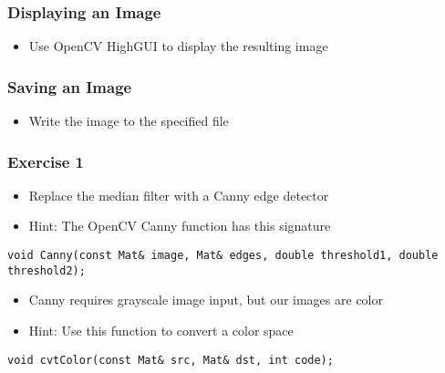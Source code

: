 \begin{frame}
\frametitle{Displaying an Image}
\begin{center}
\begin{itemize}
\item Use OpenCV HighGUI to display the resulting image
\end{itemize}

\end{center}
\end{frame}


\begin{frame}
\frametitle{Saving an Image}
\begin{center}
\begin{itemize}
\item Write the image to the specified file
\end{itemize}

\end{center}
\end{frame}


\begin{frame}[fragile]
\frametitle{Exercise 1}
\begin{center}
\begin{itemize}
\item Replace the median filter with a Canny edge detector
\end{itemize}

\begin{itemize}
\item Hint: The OpenCV Canny function has this signature
\end{itemize}
\begin{lstlisting}
void Canny(const Mat& image, Mat& edges, double threshold1, double threshold2);
\end{lstlisting}
\begin{itemize}
\item Canny requires grayscale image input, but our images are color
\item Hint: Use this function to convert a color space
\end{itemize}
\begin{lstlisting}
void cvtColor(const Mat& src, Mat& dst, int code);
\end{lstlisting}
\end{center}
\end{frame}
